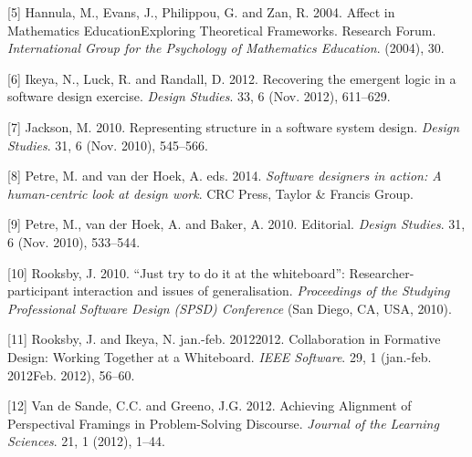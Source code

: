 \hypertarget{ref-hannulaux5faffectux5f2004}{}
{[}5{]} Hannula, M., Evans, J., Philippou, G. and Zan, R. 2004. Affect in Mathematics EducationExploring Theoretical Frameworks. Research Forum. \emph{International Group for the Psychology of Mathematics Education}. (2004), 30.

\hypertarget{ref-ikeyaux5frecoveringux5f2012}{}
{[}6{]} Ikeya, N., Luck, R. and Randall, D. 2012. Recovering the emergent logic in a software design exercise. \emph{Design Studies}. 33, 6 (Nov. 2012), 611--629.

\hypertarget{ref-jacksonux5frepresentingux5f2010}{}
{[}7{]} Jackson, M. 2010. Representing structure in a software system design. \emph{Design Studies}. 31, 6 (Nov. 2010), 545--566.

\hypertarget{ref-petreux5fsoftwareux5f2014}{}
{[}8{]} Petre, M. and van der Hoek, A. eds. 2014. \emph{Software designers in action: A human-centric look at design work}. CRC Press, Taylor \& Francis Group.

\hypertarget{ref-petreux5feditorialux5f2010}{}
{[}9{]} Petre, M., van der Hoek, A. and Baker, A. 2010. Editorial. \emph{Design Studies}. 31, 6 (Nov. 2010), 533--544.

\hypertarget{ref-rooksbyux5fjustux5f2010}{}
{[}10{]} Rooksby, J. 2010. ``Just try to do it at the whiteboard'': Researcher-participant interaction and issues of generalisation. \emph{Proceedings of the Studying Professional Software Design (SPSD) Conference} (San Diego, CA, USA, 2010).

\hypertarget{ref-rooksbyux5fcollaborationux5f2012}{}
{[}11{]} Rooksby, J. and Ikeya, N. jan.-feb. 20122012. Collaboration in Formative Design: Working Together at a Whiteboard. \emph{IEEE Software}. 29, 1 (jan.-feb. 2012Feb. 2012), 56--60.

\hypertarget{ref-vandesandeux5fachievingux5f2012}{}
{[}12{]} Van de Sande, C.C. and Greeno, J.G. 2012. Achieving Alignment of Perspectival Framings in Problem-Solving Discourse. \emph{Journal of the Learning Sciences}. 21, 1 (2012), 1--44.
